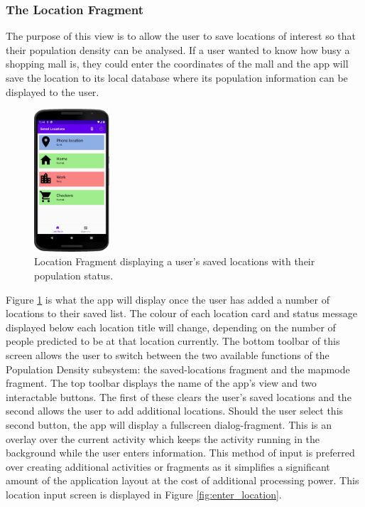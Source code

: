 \subsubsection{The Location Fragment}

The purpose of this view is to allow the user to save locations of interest so that their population density can be analysed. If a user wanted to know how busy a shopping mall is, they could enter the coordinates of the mall and the app will save the location to its local database where its population information can be displayed to the user. 

\begin{figure}[ht]
    \centering
    \includegraphics[width=0.25\textwidth]{figures/LocationFragmentDesign.PNG}
    \caption{Location Fragment displaying a user's saved locations with their population status.}
    \label{fig:location_fragment_design}
\end{figure}

Figure \ref{fig:location_fragment_design} is what the app will display once the user has added a number of locations to their saved list. The colour of each location card and status message displayed below each location title will change, depending on the number of people predicted to be at that location currently. The bottom toolbar of this screen allows the user to switch between the two available functions of the Population Density subsystem: the saved-locations fragment and the mapmode fragment. The top toolbar displays the name of the app's view and two interactable buttons. The first of these clears the user's saved locations and the second allows the user to add additional locations. Should the user select this second button, the app will display a fullscreen dialog-fragment. This is an overlay over the current activity which keeps the activity running in the background while the user enters information. This method of input is preferred over creating additional activities or fragments as it simplifies a significant amount of the application layout at the cost of additional processing power. This location input screen is displayed in Figure \ref{fig:enter_location}.

